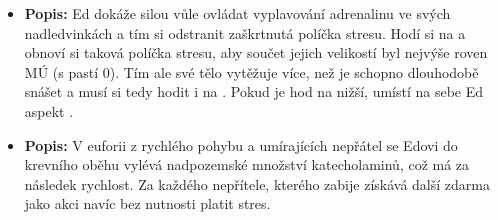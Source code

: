 \documentclass[../main.tex]{subfiles}
\begin{document}
\begin{specialita}
\begin{itemize}
	\item \textbf{Popis:} Ed dokáže silou vůle ovládat vyplavování adrenalinu ve svých nadledvinkách a tím si odstranit zaškrtnutá políčka stresu. Hodí si na  a obnoví si taková políčka stresu, aby součet jejich velikostí byl nejvýše roven MÚ (s pastí 0). Tím ale své tělo vytěžuje více, než je schopno dlouhodobě snášet a musí si tedy hodit i na . Pokud je hod na  nižší, umístí na sebe Ed aspekt .
\end{itemize}
\end{specialita}

\begin{specialita}
\begin{itemize}
	\item \textbf{Popis:} V euforii z rychlého pohybu a umírajících nepřátel se Edovi do krevního oběhu vylévá nadpozemské množství katecholaminů, což má za následek rychlost. Za každého nepřítele, kterého zabije  získává další  zdarma jako akci navíc bez nutnosti platit stres.
\end{itemize}
\end{specialita}
\end{document}
